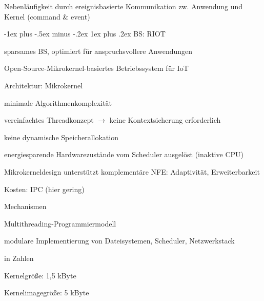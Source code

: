 \documentclass[a4paper]{article}
\makeatletter
\renewcommand{\subsubsection}{\@startsection{subsubsection}{3}{0mm}%
 {-1ex plus -.5ex minus -.2ex}%
 {1ex plus .2ex}%
 {\normalfont\small\bfseries}}
\makeatother
\begin{document}
\begin{multicols}{3}
\begin{itemize*}
\begin{itemize*}
            \item Nebenläufigkeit durch ereignisbasierte Kommunikation zw. Anwendung und Kernel (command \& event)
        \end{itemize*}
    \end{itemize*}

    \subsubsection{BS: RIOT}
    \begin{itemize*}
        \item sparsames BS, optimiert für anspruchsvollere Anwendungen
        \item Open-Source-Mikrokernel-basiertes Betriebssystem für IoT
        \item Architektur: Mikrokernel
        \begin{itemize*}
            \item minimale Algorithmenkomplexität
            \item vereinfachtes Threadkonzept $\rightarrow$ keine Kontextsicherung erforderlich
            \item keine dynamische Speicherallokation
            \item energiesparende Hardwarezustände vom Scheduler ausgelöst (inaktive CPU)
            \item Mikrokerneldesign unterstützt komplementäre NFE: Adaptivität, Erweiterbarkeit
            \item Kosten: IPC (hier gering)
        \end{itemize*}
        \item Mechanismen
        \begin{itemize*}
            \item Multithreading-Programmiermodell
            \item modulare Implementierung von Dateisystemen, Scheduler, Netzwerkstack
        \end{itemize*}
        \item in Zahlen
        \begin{itemize*}
            \item Kernelgröße: 1,5 kByte
            \item Kernelimagegröße: 5 kByte
        \end{itemize*}
    \end{itemize*}


\end{multicols}
\end{document}

